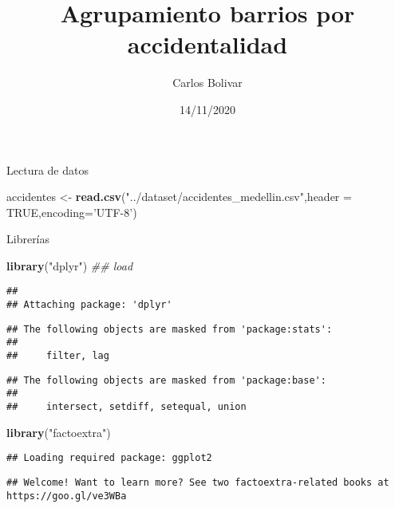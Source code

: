 \documentclass[
]{article}
\title{Agrupamiento barrios por accidentalidad}
\author{Carlos Bolivar}
\date{14/11/2020}
\newenvironment{Shaded}{\begin{snugshade}}{\end{snugshade}}
\newcommand{\CommentTok}[1]{\textcolor[rgb]{0.56,0.35,0.01}{\textit{#1}}}
\newcommand{\DataTypeTok}[1]{\textcolor[rgb]{0.13,0.29,0.53}{#1}}
\newcommand{\KeywordTok}[1]{\textcolor[rgb]{0.13,0.29,0.53}{\textbf{#1}}}
\newcommand{\NormalTok}[1]{#1}
\newcommand{\OtherTok}[1]{\textcolor[rgb]{0.56,0.35,0.01}{#1}}
\newcommand{\StringTok}[1]{\textcolor[rgb]{0.31,0.60,0.02}{#1}}
\begin{document}
\maketitle

Lectura de datos

\begin{Shaded}
\begin{Highlighting}[]
\NormalTok{accidentes <-}\StringTok{ }\KeywordTok{read.csv}\NormalTok{(}\StringTok{"../dataset/accidentes_medellin.csv"}\NormalTok{,}\DataTypeTok{header =} \OtherTok{TRUE}\NormalTok{,}\DataTypeTok{encoding=}\StringTok{'UTF-8'}\NormalTok{)}
\end{Highlighting}
\end{Shaded}

Librerías

\begin{Shaded}
\begin{Highlighting}[]
\KeywordTok{library}\NormalTok{(}\StringTok{"dplyr"}\NormalTok{) }\CommentTok{## load}
\end{Highlighting}
\end{Shaded}

\begin{verbatim}
## 
## Attaching package: 'dplyr'
\end{verbatim}

\begin{verbatim}
## The following objects are masked from 'package:stats':
## 
##     filter, lag
\end{verbatim}

\begin{verbatim}
## The following objects are masked from 'package:base':
## 
##     intersect, setdiff, setequal, union
\end{verbatim}

\begin{Shaded}
\begin{Highlighting}[]
\KeywordTok{library}\NormalTok{(}\StringTok{"factoextra"}\NormalTok{)}
\end{Highlighting}
\end{Shaded}

\begin{verbatim}
## Loading required package: ggplot2
\end{verbatim}

\begin{verbatim}
## Welcome! Want to learn more? See two factoextra-related books at https://goo.gl/ve3WBa
\end{verbatim}
\end{document}
